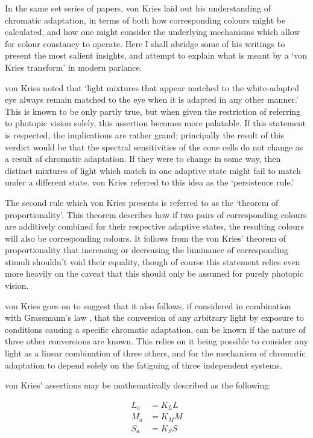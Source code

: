In the same set series of papers, von Kries laid out his understanding of chromatic adaptation, in terms of both how corresponding colours might be calculated, and how one might consider the underlying mechanisms which allow for colour constancy to operate. Here I shall abridge some of his writings to present the most salient insights, and attempt to explain what is meant by a `von Kries transform' in modern parlance.

von Kries noted that `light mixtures that appear matched to the white-adapted eye always remain matched to the eye when it is adapted in any other manner.' This is known to be only partly true, but when given the restriction of referring to photopic%
vision solely, this assertion becomes more palatable. If this statement is respected, the implications are rather grand; principally the result of this verdict would be that the spectral sensitivities of the cone cells do not change as a result of chromatic adaptation. If they were to change in some way, then distinct mixtures of light which match in one adaptive state might fail to match under a different state. von Kries referred to this idea as the `persistence rule.'

The second rule which von Kries presents is referred to as the `theorem of proportionality'. This theorem describes how if two pairs of corresponding colours are additively combined for their respective adaptive states, the resulting colours will also be corresponding colours. 
It follows from the von Kries' theorem of proportionality that increasing or decreasing the luminance of corresponding stimuli shouldn't void their equality, though of course this statement relies even more heavily on the caveat that this should only be assumed for purely photopic vision.

von Kries goes on to suggest that it also follows, if considered in combination with Grassmann's law \citep{grassmann_zur_1853}, that the conversion of any arbitrary light by exposure to conditions causing a specific chromatic adaptation, can be known if the nature of three other conversions are known. This relies on it being possible to consider any light as a linear combination of three others, and for the mechanism of chromatic adaptation to depend solely on the fatiguing of three independent systems.

von Kries' assertions may be mathematically described as the following:

\begin{subequations}
\begin{align}
L_{a}&=K_{L}L \\
M_{a}&=K_{M}M \\
S_{a}&=K_{S}S
\end{align}
\end{subequations}

